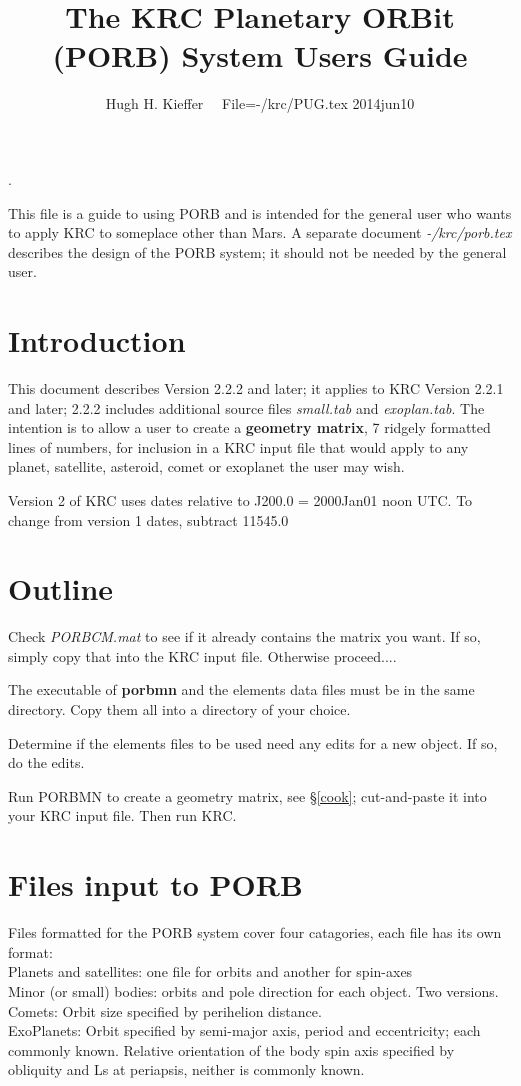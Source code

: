 \documentclass[draft]{article}  %
\title{The KRC Planetary ORBit (PORB) System Users Guide}
\author{Hugh H. Kieffer  \ \ File=-/krc/PUG.tex 2014jun10}
\newcommand{\np}{\textbf}  %
\newcommand{\nf}{\textit}  %
\newcommand{\qi}{\\ \hspace*{2.em}}      %
\begin{document}
\maketitle
\tableofcontents
\hrulefill .\hrulefill

This file is a guide to using PORB and is intended for the general user who
wants to apply KRC to someplace other than Mars.  A separate document
\nf{-/krc/porb.tex} describes the design of the PORB system; it should not be
needed by the general user.

\section{Introduction} 
This document describes Version 2.2.2 and later; it applies to KRC Version 2.2.1
and later; 2.2.2 includes additional source files \nf{small.tab} and
\nf{exoplan.tab}. The intention is to allow a user to create a \textbf{geometry
  matrix}, 7 ridgely formatted lines of numbers, for inclusion in a KRC input
file that would apply to any planet, satellite, asteroid, comet or exoplanet the
user may wish.

Version 2 of KRC uses dates relative to J200.0 = 2000Jan01 noon UTC. To change
from version 1 dates, subtract 11545.0

\section{Outline}

Check \nf{PORBCM.mat} to see if it already contains the matrix you want. If so, simply copy that into the KRC input file. Otherwise proceed....

The executable of \np{porbmn} and the elements data files must be in the same directory. Copy them all into a directory of your choice.

Determine if the elements files to be used need any edits for a new object.
 If so, do the edits.

Run PORBMN to create a geometry matrix, see \S \ref{cook}; cut-and-paste it into your KRC input
file. Then run KRC.

\section{Files input to PORB} %
Files formatted for the PORB system cover four catagories, each file has its own format:
\qi Planets and satellites:  one file for orbits and another for spin-axes
\qi Minor (or small) bodies: orbits and pole direction for each object. Two versions.
\qi Comets: Orbit size specified by perihelion distance.  
\qi ExoPlanets: Orbit specified by semi-major axis, period and eccentricity; each commonly known. Relative orientation of the body spin axis specified by obliquity and Ls at periapsis, neither is commonly known.
\end{document}
